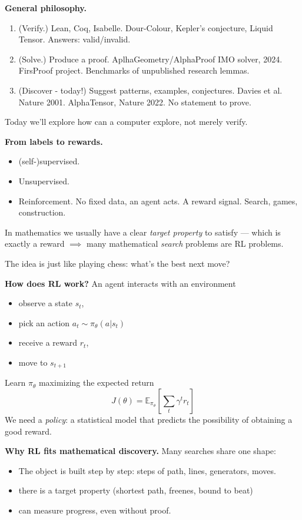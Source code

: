 \medskip\noindent
{\bf General philosophy.}
\begin{enumerate}
\item (Verify.) Lean, Coq, Isabelle.
Dour-Colour, Kepler's conjecture, Liquid
Tensor. Answers: valid/invalid.
\item (Solve.) Produce a proof.
AplhaGeometry/AlphaProof IMO solver, 2024.
FirsProof project. Benchmarks of unpublished
research lemmas.
\item (Discover - today!) Suggest patterns,
examples, conjectures. Davies et al. Nature
2001. AlphaTensor, Nature 2022. No statement
to prove.
\end{enumerate}

\noindent
Today we'll explore how can a computer
explore, not merely verify.

\medskip\noindent
{\bf From labels to rewards.}

\begin{itemize}
\item (self-)supervised.
\item Unsupervised.
\item Reinforcement. No fixed data, an agent
acts. A reward signal. Search, games,
construction.
\end{itemize}

\noindent
In mathematics we usually have a clear
{\it target property} to satisfy ---
which is exactly a reward
$\implies $ many mathematical {\it search}
problems are RL problems.

The idea is just like playing chess:
what's the best next move?

\medskip\noindent
{\bf How does RL work?}
An agent interacts with an environment
\begin{itemize}
\item observe a state $s_t$,
\item pick an action $a_t
\sim\pi_\theta(a|s_t)$
\item receive a reward $r_t$,
\item move to $s_{t+1}$
\end{itemize}

\noindent
Learn $\pi_\theta$ maximizing the expected
return
$$
J(\theta)= \mathbb{E}_{\pi_\theta}
\left[ \sum_t \gamma^t r_t
\right]
$$
We need a {\it policy}: a statistical model
that predicts the possibility of obtaining a
good reward.

\medskip\noindent
{\bf Why RL fits mathematical discovery.}
Many searches share one shape:
\begin{itemize}
\item The object is built step by step:
steps of path, lines, generators, moves.
\item there is a target property (shortest
path, freenes, bound to beat)
\item can measure progress, even without
proof.
\end{itemize}

